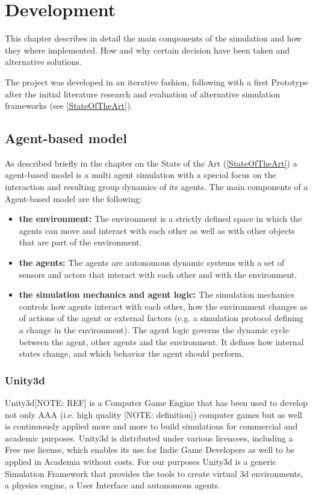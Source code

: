 \chapter{Development}
This chapter describes in detail the main components of the simulation and how
they where implemented. How and why certain decision have been taken and alternative
solutions.

The project was developed in an iterative fashion, following with a first Prototype
after the initial literature research and evaluation of alternative simulation frameworks
(see \ref{StateOfTheArt}).

\section{Agent-based model}
As described briefly in the chapter on the State of the Art (\ref{StateOfTheArt})
a agent-based model is a multi agent simulation with a special focus on the interaction
and resulting group dynamics of its agents. The main components of a Agent-based
model are the following:

\begin{itemize}
    \item \textbf{the environment:} The environment is a strictly
    defined space in which the agents can move and interact with each other as 
    well as with other objects that are part of the environment. 
    \item \textbf{the agents:} The agents are autonomous dynamic systems with a
    set of sensors and actors that interact with each other and with the environment.
    \item \textbf{the simulation mechanics and agent logic:}  The simulation mechanics
    controls how agents interact with each other, how the environment changes
    as of actions of the agent or external factors (e.g. a simulation protocol defining
    a change in the environment). The agent logic governs the dynamic cycle between
    the agent, other agents and the environment. It defines how internal states change,
    and which behavior the agent should perform.
\end{itemize}

\subsection{Unity3d}
Unity3d[NOTE: REF] is a Computer Game Engine that has been used to develop not only
AAA (i.e. high quality [NOTE: definition]) computer games but as well is continuously
applied more and more to build simulations for commercial and academic purposes.
Unity3d is distributed under various licencees, including a Free use license, which
enables its use for Indie Game Developers as well to be applied in Academia without costs.
For our purposes Unity3d is a generic Simulation Framework that provides the tools
to create virtual 3d environments, a physics engine, a User Interface and autonomous
agents.

